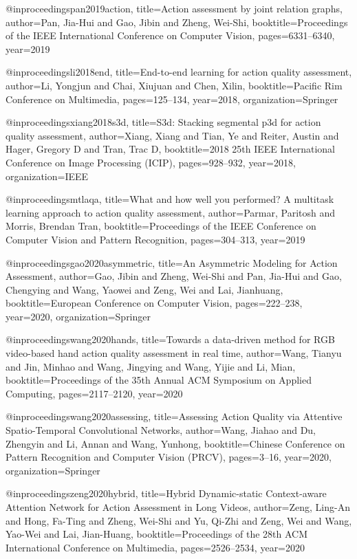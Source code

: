 @inproceedings{pan2019action,
  title={Action assessment by joint relation graphs},
  author={Pan, Jia-Hui and Gao, Jibin and Zheng, Wei-Shi},
  booktitle={Proceedings of the IEEE International Conference on Computer Vision},
  pages={6331--6340},
  year={2019}
}

@inproceedings{li2018end,
  title={End-to-end learning for action quality assessment},
  author={Li, Yongjun and Chai, Xiujuan and Chen, Xilin},
  booktitle={Pacific Rim Conference on Multimedia},
  pages={125--134},
  year={2018},
  organization={Springer}
}

@inproceedings{xiang2018s3d,
  title={S3d: Stacking segmental p3d for action quality assessment},
  author={Xiang, Xiang and Tian, Ye and Reiter, Austin and Hager, Gregory D and Tran, Trac D},
  booktitle={2018 25th IEEE International Conference on Image Processing (ICIP)},
  pages={928--932},
  year={2018},
  organization={IEEE}
}

@inproceedings{mtlaqa,
  title={What and how well you performed? A multitask learning approach to action quality assessment},
  author={Parmar, Paritosh and Morris, Brendan Tran},
  booktitle={Proceedings of the IEEE Conference on Computer Vision and Pattern Recognition},
  pages={304--313},
  year={2019}
}

@inproceedings{gao2020asymmetric,
  title={An Asymmetric Modeling for Action Assessment},
  author={Gao, Jibin and Zheng, Wei-Shi and Pan, Jia-Hui and Gao, Chengying and Wang, Yaowei and Zeng, Wei and Lai, Jianhuang},
  booktitle={European Conference on Computer Vision},
  pages={222--238},
  year={2020},
  organization={Springer}
}

@inproceedings{wang2020hands,
  title={Towards a data-driven method for RGB video-based hand action quality assessment in real time},
  author={Wang, Tianyu and Jin, Minhao and Wang, Jingying and Wang, Yijie and Li, Mian},
  booktitle={Proceedings of the 35th Annual ACM Symposium on Applied Computing},
  pages={2117--2120},
  year={2020}
}

@inproceedings{wang2020assessing,
  title={Assessing Action Quality via Attentive Spatio-Temporal Convolutional Networks},
  author={Wang, Jiahao and Du, Zhengyin and Li, Annan and Wang, Yunhong},
  booktitle={Chinese Conference on Pattern Recognition and Computer Vision (PRCV)},
  pages={3--16},
  year={2020},
  organization={Springer}
}

@inproceedings{zeng2020hybrid,
  title={Hybrid Dynamic-static Context-aware Attention Network for Action Assessment in Long Videos},
  author={Zeng, Ling-An and Hong, Fa-Ting and Zheng, Wei-Shi and Yu, Qi-Zhi and Zeng, Wei and Wang, Yao-Wei and Lai, Jian-Huang},
  booktitle={Proceedings of the 28th ACM International Conference on Multimedia},
  pages={2526--2534},
  year={2020}
}

